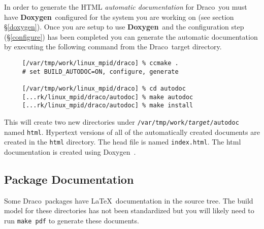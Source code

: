 \documentclass[11pt]{nmemo}
\newcommand{\comp}[1]{\normalfont\footnotesize\texttt{#1}\normalsize}
\newcommand{\draco}{{\normalfont\sffamily Draco}}
\newcommand{\doxygen}{{\normalfont\bfseries Doxygen}}
\begin{document}
In order to generate the HTML 
\emph{automatic documentation} for \draco\ you must have
\doxygen\ configured for the system you are working on (see section
\S\ref{doxygen}).  Once you are setup to use \doxygen\ and the
configuration step (\S\ref{configure}) has been completed you can
generate the automatic documentation by executing the following
command from the \draco\ target directory.

\footnotesize
\begin{verbatim}
     [/var/tmp/work/linux_mpid/draco] % ccmake .
     # set BUILD_AUTODOC=ON, configure, generate

     [/var/tmp/work/linux_mpid/draco] % cd autodoc
     [...rk/linux_mpid/draco/autodoc] % make autodoc
     [...rk/linux_mpid/draco/autodoc] % make install
\end{verbatim}
\normalsize

This will create two new directories under
\comp{/var/tmp/work/\emph{target}/autodoc} named \comp{html}.
Hypertext versions of all of the automatically created documents are
created in the \comp{html} directory.  The head file is named
\comp{index.html}.  The html documentation is created using
Doxygen~\cite{doxygen}.


\subsection{Package Documentation}

Some \draco\ packages have \LaTeX\ documentation in the source tree.
The build model for these directories has not been standardized but
you will likely need to run \comp{make pdf} to generate these
documents.  
\end{document}
